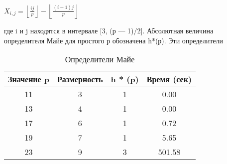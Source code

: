 \begin{center}
\( X_{i,j} = \left\lfloor \frac{ij}{p} \right\rfloor - \left\lfloor \frac{(i-1)j}{p} \right\rfloor \)
\end{center}

где i и j находятся в интервале [3, (р — 1)/2]. Абсолютная величина
определителя Майе для простого р обозначена h*(р). Эти определители

\begin{wraptable}{l}{10cm}
\begin{tabular}{|c|c|c|c|}
\hline
Значение p & Размерность & h * (p) & Время (сек) \\ \hline
11 & 3 & 1 & 0.00 \\
13 & 4 & 1 & 0.00 \\
17 & 6 & 1 & 0.72 \\
19 & 7 & 1 & 5.65 \\
23 & 9 & 3 & 501.58 \\ \hline
\end{tabular}
\caption{Определители Майе}
\end{wraptable} 

